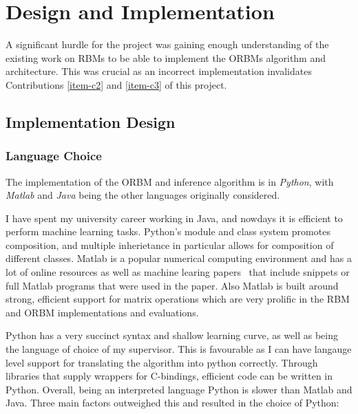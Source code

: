 \chapter{Design and Implementation}\label{C:work}

A significant hurdle for the project was gaining enough understanding of the existing work on RBMs to be able to implement the ORBMs algorithm and architecture. This was crucial as an incorrect implementation invalidates Contributions \ref{item-c2} and \ref{item-c3} of this project.


\section{Implementation Design}

\subsection{Language Choice}

The implementation of the ORBM and inference algorithm is in \emph{Python}, with \emph{Matlab} and \emph{Java} being the other languages originally considered.

I have spent my university career working in Java, and nowdays it is efficient to perform machine learning tasks. Python's module and class system promotes composition, and multiple inherietance in particular allows for composition of different classes. Matlab is a popular numerical computing environment and has a lot of online resources as well as machine learing papers~\cite{hinton2006reducing} that include snippets or full Matlab programs that were used in the paper. Also Matlab is built around strong, efficient support for matrix operations which are very prolific in the RBM and ORBM implementations and evaluations.

Python has a very succinct syntax and shallow learning curve, as well as being the language of choice of my supervisor. This is favourable as I can have langauge level support for translating the algorithm into python correctly. Through libraries that supply wrappers for C-bindings, efficient code can be written in Python. Overall, being an interpreted language Python is slower than Matlab and Java. Three main factors outweighed this and resulted in the choice of Python:


